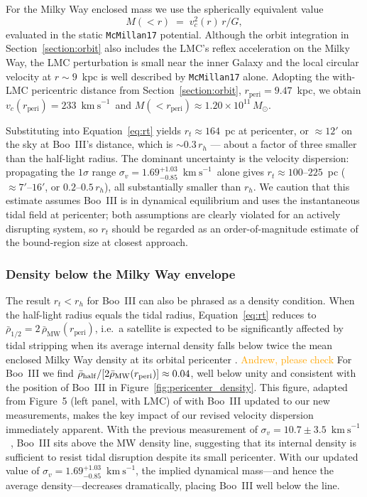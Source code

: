 \documentclass[twocolumn, apj, numberedappendix, appendixfloats]{openjournal_dhayaa}
\newcommand{\vlosUnits}{$\mathrm{km~s}^{-1}$\xspace}
\newcommand{\fixme}{\textcolor{orange}}
\begin{document}
For the Milky Way enclosed mass we use the spherically equivalent value
\begin{equation}
    M(<r) \;=\; v_c^2(r)\,r/G,
\end{equation}
evaluated in the static \texttt{McMillan17} potential. Although the orbit integration in Section~\ref{section:orbit} also includes the LMC's reflex acceleration on the Milky Way, the LMC perturbation is small near the inner Galaxy and the local circular velocity at $r \sim 9$~kpc is well described by \texttt{McMillan17} alone. Adopting the with-LMC pericentric distance from Section~\ref{section:orbit}, $r_{\mathrm{peri}} = 9.47$~kpc, we obtain $v_c(r_{\mathrm{peri}}) = 233$~\vlosUnits\ and $M(<r_{\mathrm{peri}}) \approx 1.20 \times 10^{11}\,M_\odot$.

Substituting into Equation~\ref{eq:rt} yields $r_t \approx 164$~pc at pericenter, or $\approx 12'$ on the sky at Boo~III's distance, which is $\sim 0.3\,r_h$ --- about a factor of three smaller than the half-light radius. The dominant uncertainty is the velocity dispersion: propagating the $1\sigma$ range $\sigma_v = 1.69^{+1.03}_{-0.85}$~\vlosUnits\ alone gives $r_t \approx 100$--$225$~pc ($\approx 7'$--$16'$, or $0.2$--$0.5\,r_h$), all substantially smaller than $r_h$. We caution that this estimate assumes Boo~III is in dynamical equilibrium and uses the instantaneous tidal field at pericenter; both assumptions are clearly violated for an actively disrupting system, so $r_t$ should be regarded as an order-of-magnitude estimate of the bound-region size at closest approach.

\subsubsection{Density below the Milky Way envelope}
The result $r_t < r_h$ for Boo~III can also be phrased as a density condition.  When the half-light radius equals the tidal radius, Equation~\ref{eq:rt} reduces to $\bar\rho_{1/2} = 2\,\bar\rho_{\mathrm{MW}}(r_{\mathrm{peri}})$, i.e.\ a satellite is expected to be significantly affected by tidal stripping when its average internal density falls below twice the mean enclosed Milky Way density at its orbital pericenter \citep{Pace2022}. \fixme{Andrew, please check}  For Boo~III we find $\bar\rho_{\rm half}/[2\bar\rho_{\mathrm{MW}}(r_{\mathrm{peri}})] \approx 0.04$, well below unity and consistent with the position of Boo~III in Figure~\ref{fig:pericenter_density}.  This figure, adapted from Figure~5 (left panel, with LMC) of \citet{Pace2022} with Boo~III updated to our new measurements, makes the key impact of our revised velocity dispersion immediately apparent.  With the previous measurement of $\sigma_v = 10.7 \pm 3.5$~\vlosUnits\ \citep{Carlin2018}, Boo~III sits above the MW density line, suggesting that its internal density is sufficient to resist tidal disruption despite its small pericenter.  With our updated value of $\sigma_v = 1.69^{+1.03}_{-0.85}$~\vlosUnits, the implied dynamical mass---and hence the average density---decreases dramatically, placing Boo~III well below the line.
\end{document}
